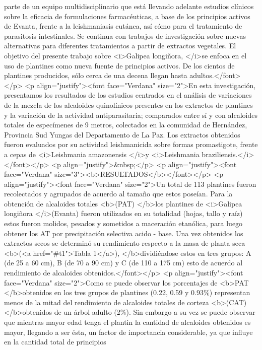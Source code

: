 parte de un equipo multidisciplinario que está llevando adelante estudios
clínicos sobre la eficacia de formulaciones farmacéuticas, a base de los
principios activos de Evanta, frente a la leishmaniasis cutánea, así cómo para
el tratamiento de parasitosis intestinales. Se continua con trabajos de
investigación sobre nuevas alternativas para diferentes tratamientos a partir de
extractos vegetales. El objetivo del presente trabajo sobre <i>Galipea
longiñora, </i>se enfoca en el uso de plantines como nueva fuente de principios
activos. De los cientos de plantines producidos, sólo cerca de una decena llegan
hasta adultos.</font></p> <p align="justify"><font face="Verdana" size="2">En
esta investigación, presentamos los resultados de los estudios centrados en el
análisis de variaciones de la mezcla de los alcaloides quinolínicos presentes en
los extractos de plantines y la variación de la actividad antiparasitaria;
comparados entre sí y con alcaloides totales de especímenes de 9 metros,
colectados en la comunidad de Hernández, Provincia Sud Yungas del Departamento
de La Paz. Los extractos obtenidos fueron evaluados por su actividad
leishmanicida sobre formas promastigote, frente a cepas de <i>Leishmania
amazonensis </i>y <i>Leishmania braziliensis.</i></font></p> <p
align="justify">\&nbsp;</p> <p align="justify"><font face="Verdana"
size="3"><b>RESULTADOS</b></font></p> <p align="justify"><font face="Verdana"
size="2">Un total de 113 plantines fueron recolectados y agrupados de acuerdo al
tamaño que estos poseían. Para la obtención de alcaloides totales <b>(PAT)
</b>los plantines de <i>Galipea longiñora </i>(Evanta) fueron utilizados en su
totalidad (hojas, tallo y raíz) estos fueron molidos, pesados y sometidos a
maceración etanólica, para luego obtener los AT por precipitación selectiva
acido - base. Una vez obtenidos los extractos secos se determinó su rendimiento
respecto a la masa de planta seca <b>(<a href="\#t1">Tabla 1</a>),
</b>dividiéndose estos en tres grupos: A (de 25 a 60 cm), B (de 70 a 90 cm) y C
(de 110 a 175 cm) esto de acuerdo al rendimiento de alcaloides
obtenidos.</font></p> <p align="justify"><font face="Verdana" size="2">Como se
puede observar los porcentajes de <b>PAT </b>obtenidos en los tres grupos de
plantines (0.22, 0.59 y 0.93\%) representan menos de la mitad del rendimiento de
alcaloides totales de corteza <b>(CAT) </b>obtenidos de un árbol adulto (2\%).
Sin embargo a su vez se puede observar que mientras mayor edad tenga el plantin
la cantidad de alcaloides obtenidos es mayor, llegando a ser ésta, un factor de
importancia considerable, ya que influye en la cantidad total de principios
